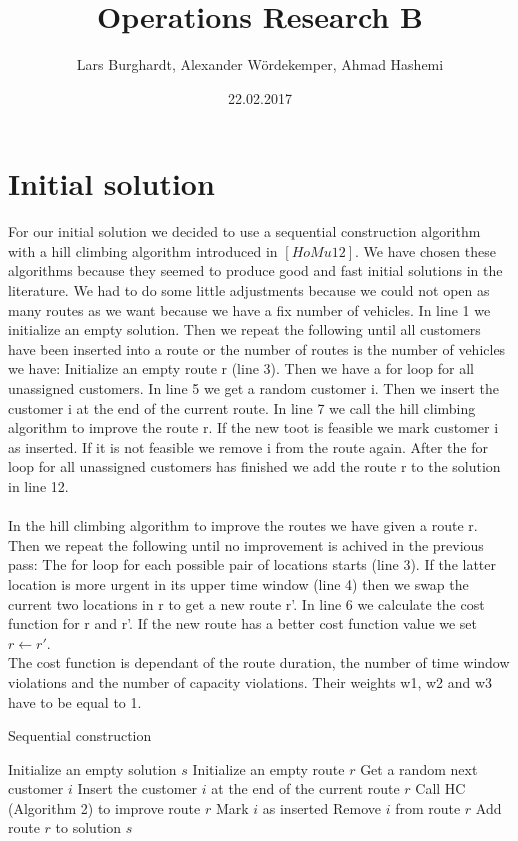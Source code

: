 \documentclass[fleqn]{scrartcl}
\title{Operations Research B}
\author{Lars Burghardt, Alexander Wördekemper, Ahmad Hashemi}
\date{22.02.2017}
\begin{document}
\maketitle
\tableofcontents
\section{Initial solution}

For our initial solution we decided to use a sequential construction algorithm with a hill climbing algorithm introduced in $[HoMu 12]$. We have chosen these algorithms because they seemed to produce good and fast initial solutions in the literature. We had to do some little adjustments because we could not open as many routes as we want because we have a fix number of vehicles. In line 1 we initialize an empty solution. Then we repeat the following until all customers have been inserted into a route or the number of routes is the number of vehicles we have: Initialize an empty route r (line 3). Then we have a for loop for all unassigned customers. In line 5 we get a random customer i. Then we insert the customer i at the end of the current route. In line 7 we call the hill climbing algorithm to improve the route r. If the new toot is feasible we mark customer i as inserted. If it is not feasible we remove i from the route again. After the for loop for all unassigned customers has finished we add the route r to the solution in line 12.
\\
\\  
In the hill climbing algorithm to improve the routes we have given a route r. Then we repeat the following until no improvement is achived in the previous pass: The for loop for each possible pair of locations starts (line 3). If the latter location is more urgent in its upper time window (line 4) then we swap the current two locations in r to get a new route r'. In line 6 we calculate the cost function for r and r'. If the new route has a better cost function value we set $r\gets r'$.\\
The cost function is dependant of the route duration, the number of time window violations and the number of capacity violations. Their weights w1, w2 and w3 have to be equal to 1.

\begin{algorithm}
\caption{Sequential construction}\label{sequential}
\begin{algorithmic}[1]
\State Initialize an empty solution $s$
\Repeat
\State Initialize an empty route $r$
\State Get a random next customer $i$
\State Insert the customer $i$ at the end of the current route $r$
\State Call HC (Algorithm 2) to improve route $r$
\State Mark $i$ as inserted
\Else
\State Remove $i$ from route $r$
\EndIf
\EndFor
\State Add route $r$ to solution $s$
\end{algorithmic}
\end{algorithm}
\end{document}
